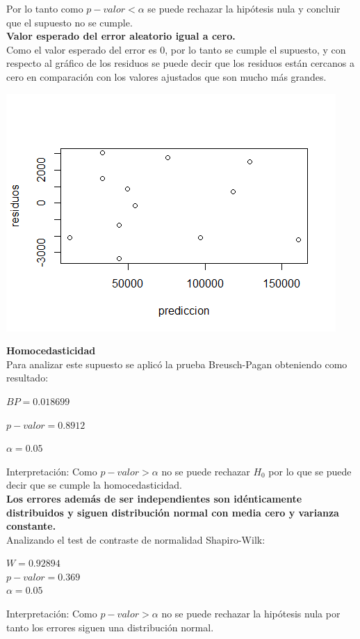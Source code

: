 \documentclass[12pt,a4paper]{article}
\begin{document}
	Por lo tanto como $p-valor < \alpha$ se puede rechazar la hipótesis nula y concluir que el supuesto no se cumple.\\
	
	\textbf{Valor esperado del error aleatorio igual a cero.}\\
	Como el valor esperado del error es 0, por lo tanto se cumple el supuesto, y con respecto al gráfico de los residuos se puede decir que los residuos están cercanos a cero en comparación con los valores ajustados que son mucho más grandes.
	
	\begin{center} 
		\includegraphics[scale=0.8]{./images/PLOT2.png}
	\end{center}
	
	\textbf{Homocedasticidad}\\
	Para analizar este supuesto se aplicó la prueba Breusch-Pagan obteniendo como resultado:
	
	\begin{center}
		$BP = 0.018699$
		
		$p-valor = 0.8912$
		
		$\alpha = 0.05$
	\end{center}
	
	
	Interpretación: Como $p-valor > \alpha$ no se puede rechazar $H_0$ por lo que se puede decir que se cumple la homocedasticidad.\\
	
	\textbf{Los errores además de ser independientes son idénticamente distribuidos y siguen distribución normal con media cero y varianza constante.}\\
	Analizando el test de contraste de normalidad Shapiro-Wilk:
	\begin{center}
		$W = 0.92894$ \\
		$p-valor = 0.369$\\
		$\alpha = 0.05$
	\end{center}
	Interpretación: Como $p-valor > \alpha$ no se puede rechazar la hipótesis nula por tanto los errores siguen una distribución normal.
	
\end{document}
